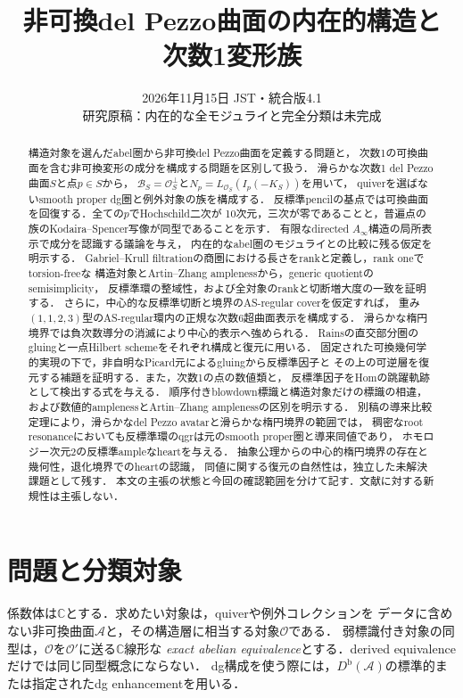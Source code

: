 \documentclass[11pt,a4paper]{ltjsarticle}
\title{非可換del Pezzo曲面の内在的構造と\\次数1変形族}
\author{}
\date{2026年11月15日 JST・統合版4.1\\研究原稿：内在的な全モジュライと完全分類は未完成}
\theoremstyle{definition}
\newcommand{\OO}{\mathcal O}
\renewcommand{\AA}{\mathcal A}
\newcommand{\BB}{\mathcal B}
\newcommand{\Db}{D^{\mathrm b}}
\begin{document}
\maketitle
\begin{abstract}
構造対象を選んだabel圏から非可換del Pezzo曲面を定義する問題と，
次数1の可換曲面を含む非可換変形の成分を構成する問題を区別して扱う．
滑らかな次数1 del Pezzo曲面$S$と点$p\in S$から，
$\BB_S=\OO_S^\perp$と$N_p=L_{\OO_S}(I_p(-K_S))$を用いて，
quiverを選ばないsmooth proper dg圏と例外対象の族を構成する．
反標準pencilの基点では可換曲面を回復する．全ての$p$でHochschild二次が
10次元，三次が零であることと，普遍点の族のKodaira--Spencer写像が同型であることを示す．
有限なdirected $A_\infty$構造の局所表示で成分を認識する議論を与え，
内在的なabel圏のモジュライとの比較に残る仮定を明示する．
Gabriel--Krull filtrationの商圏における長さをrankと定義し，rank oneでtorsion-freeな
構造対象とArtin--Zhang amplenessから，generic quotientのsemisimplicity，
反標準環の整域性，および全対象のrankと切断増大度の一致を証明する．
さらに，中心的な反標準切断と境界のAS-regular coverを仮定すれば，
重み$(1,1,2,3)$型のAS-regular環内の正規な次数6超曲面表示を構成する．
滑らかな楕円境界では負次数導分の消滅により中心的表示へ強められる．
Rainsの直交部分圏のgluingと一点Hilbert schemeをそれぞれ構成と復元に用いる．
固定された可換幾何学的実現の下で，非自明なPicard元によるgluingから反標準因子と
その上の可逆層を復元する補題を証明する．また，次数1の点の数値類と，
反標準因子をHomの跳躍軌跡として検出する式を与える．
順序付きblowdown標識と構造対象だけの標識の相違，
および数値的amplenessとArtin--Zhang amplenessの区別を明示する．
別稿の導来比較定理により，滑らかなdel Pezzo avatarと滑らかな楕円境界の範囲では，
稠密なroot resonanceにおいても反標準環のqgrは元のsmooth proper圏と導来同値であり，
ホモロジー次元2の反標準ampleなheartを与える．
抽象公理からの中心的楕円境界の存在と幾何性，退化境界でのheartの認識，
同値に関する復元の自然性は，独立した未解決課題として残す．
本文の主張の状態と今回の確認範囲を分けて記す．文献に対する新規性は主張しない．
\end{abstract}

\section{問題と分類対象}
係数体は$\mathbb C$とする．求めたい対象は，quiverや例外コレクションを
データに含めない非可換曲面$\AA$と，その構造層に相当する対象$\OO$である．
弱標識付き対象の同型は，$\OO$を$\OO'$に送る$\mathbb C$線形な
\emph{exact abelian equivalence}とする．derived equivalenceだけでは同じ同型概念にならない．
dg構成を使う際には，$\Db(\AA)$の標準的または指定されたdg enhancementを用いる．
\end{document}
